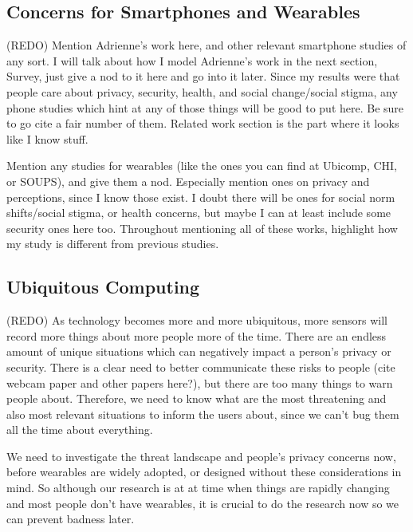 \documentclass{acm_proc_article-sp}
\begin{document}
\subsection{Concerns for Smartphones and Wearables}
(REDO) Mention Adrienne's work here, and other relevant smartphone studies of any sort. I will talk about how I model Adrienne's work in the next section, Survey, just give a nod to it here and go into it later. Since my results were that people care about privacy, security, health, and social change/social stigma, any phone studies which hint at any of those things will be good to put here. Be sure to go cite a fair number of them. Related work section is the part where it looks like I know stuff. 

Mention any studies for wearables (like the ones you can find at Ubicomp, CHI, or SOUPS), and give them a nod. Especially mention ones on privacy and perceptions, since I know those exist. I doubt there will be ones for social norm shifts/social stigma, or health concerns, but maybe I can at least include some security ones here too. Throughout mentioning all of these works, highlight how my study is different from previous studies. 

\subsection{Ubiquitous Computing}
(REDO) As technology becomes more and more ubiquitous, more sensors will record more things about more people more of the time. There are an endless amount of unique situations which can negatively impact a person's privacy or security. There is a clear need to better communicate these risks to people (cite webcam paper and other papers here?), but there are too many things to warn people about. Therefore, we need to know what are the most threatening and also most relevant situations to inform the users about, since we can't bug them all the time about everything. 

We need to investigate the threat landscape and people's privacy concerns now, before wearables are widely adopted, or designed without these considerations in mind. So although our research is at at time when things are rapidly changing and most people don't have wearables, it is crucial to do the research now so we can prevent badness later.
\end{document}
